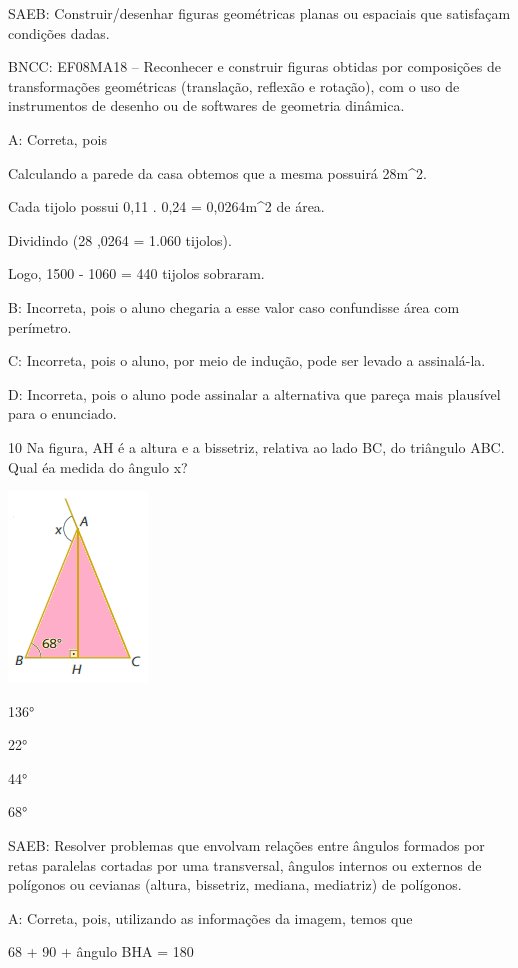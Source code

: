 {SAEB: Construir/desenhar figuras geométricas planas ou espaciais que
satisfaçam condições dadas.

BNCC: EF08MA18 -- Reconhecer e construir figuras obtidas por composições
de transformações geométricas (translação, reflexão e rotação), com o
uso de instrumentos de desenho ou de softwares de geometria dinâmica.

A: Correta, pois

Calculando a parede da casa obtemos que a mesma possuirá 28m^2.

Cada tijolo possui 0,11 . 0,24 = 0,0264m^2 de área.

Dividindo (28 ,0264 = 1.060\; tijolos).

Logo, 1500 - 1060 = 440 tijolos sobraram.

B: Incorreta, pois o aluno chegaria a esse valor caso confundisse área
com perímetro.

C: Incorreta, pois o aluno, por meio de indução, pode ser levado a
assinalá-la.

D: Incorreta, pois o aluno pode assinalar a alternativa que pareça mais
plausível para o enunciado.

\num{10} Na figura, AH é a altura e a bissetriz, relativa ao lado BC, do
triângulo ABC. Qual éa medida do ângulo x?

\includegraphics[width=1.45833in,height=2in]{./imgSAEB_8_MAT/media/image58.png}
\item 136°
\item 22°
\item 44°
\item 68°

SAEB: Resolver problemas que envolvam relações entre ângulos formados
por retas paralelas cortadas por uma transversal, ângulos internos ou
externos de polígonos ou cevianas (altura, bissetriz, mediana,
mediatriz) de polígonos.

A: Correta, pois, utilizando as informações da imagem, temos que

68 + 90 + ângulo BHA = 180

}
